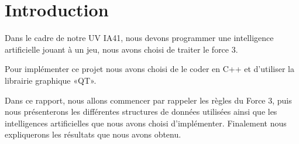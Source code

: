 \chapter{Introduction}

Dans le cadre de notre UV IA41, nous devons programmer une intelligence
artificielle jouant à un jeu, nous avons choisi de traiter le force 3.

Pour implémenter ce projet nous avons choisi de le coder en C++ et d'utiliser la
librairie graphique «QT».

Dans ce rapport, nous allons commencer par rappeler les règles du Force 3, puis
nous présenterons les différentes structures de données utilisées ainsi que les
intelligences artificielles que nous avons choisi d'implémenter. Finalement nous
expliquerons les résultats que nous avons obtenu.
